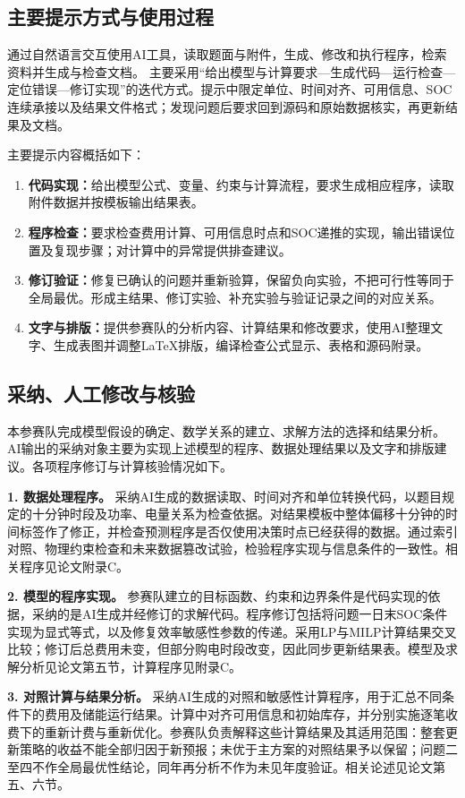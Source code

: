 \documentclass[withoutpreface,bwprint]{cumcmthesis}
\begin{document}
\clearpage
\subsection*{主要提示方式与使用过程}
通过自然语言交互使用AI工具，读取题面与附件，生成、修改和执行程序，检索资料并生成与检查文档。
主要采用“给出模型与计算要求—生成代码—运行检查—定位错误—修订实现”的迭代方式。提示中限定单位、时间对齐、可用信息、SOC连续承接以及结果文件格式；发现问题后要求回到源码和原始数据核实，再更新结果及文档。

主要提示内容概括如下：
\begin{enumerate}[label=\arabic*)]
\item \textbf{代码实现：}给出模型公式、变量、约束与计算流程，要求生成相应程序，读取附件数据并按模板输出结果表。
\item \textbf{程序检查：}要求检查费用计算、可用信息时点和SOC递推的实现，输出错误位置及复现步骤；对计算中的异常提供排查建议。
\item \textbf{修订验证：}修复已确认的问题并重新验算，保留负向实验，不把可行性等同于全局最优。形成主结果、修订实验、补充实验与验证记录之间的对应关系。
\item \textbf{文字与排版：}提供参赛队的分析内容、计算结果和修改要求，使用AI整理文字、生成表图并调整LaTeX排版，编译检查公式显示、表格和源码附录。
\end{enumerate}

\subsection*{采纳、人工修改与核验}
本参赛队完成模型假设的确定、数学关系的建立、求解方法的选择和结果分析。AI输出的采纳对象主要为实现上述模型的程序、数据处理结果以及文字和排版建议。各项程序修订与计算核验情况如下。

\noindent\textbf{1. 数据处理程序。}
采纳AI生成的数据读取、时间对齐和单位转换代码，以题目规定的十分钟时段及功率、电量关系为检查依据。对结果模板中整体偏移十分钟的时间标签作了修正，并检查预测程序是否仅使用决策时点已经获得的数据。通过索引对照、物理约束检查和未来数据篡改试验，检验程序实现与信息条件的一致性。相关程序见论文附录C。

\noindent\textbf{2. 模型的程序实现。}
参赛队建立的目标函数、约束和边界条件是代码实现的依据，采纳的是AI生成并经修订的求解代码。程序修订包括将问题一日末SOC条件实现为显式等式，以及修复效率敏感性参数的传递。采用LP与MILP计算结果交叉比较；修订后总费用未变，但部分购电时段改变，因此同步更新结果表。模型及求解分析见论文第五节，计算程序见附录C。

\clearpage
\noindent\textbf{3. 对照计算与结果分析。}
采纳AI生成的对照和敏感性计算程序，用于汇总不同条件下的费用及储能运行结果。计算中对齐可用信息和初始库存，并分别实施逐笔收费下的重新计费与重新优化。参赛队负责解释这些计算结果及其适用范围：整套更新策略的收益不能全部归因于新预报；未优于主方案的对照结果予以保留；问题二至四不作全局最优性结论，同年再分析不作为未见年度验证。相关论述见论文第五、六节。
\end{document}
